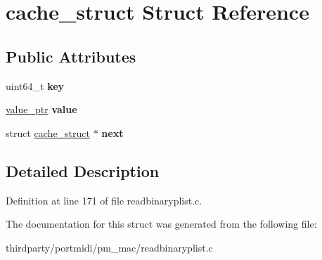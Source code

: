 \hypertarget{structcache__struct}{}\section{cache\+\_\+struct Struct Reference}
\label{structcache__struct}
\subsection*{Public Attributes}
\begin{DoxyCompactItemize}
\item 
\mbox{\label{structcache__struct_af242c8abd9d0d23e8fb7b8c0809fa598}} 
uint64\+\_\+t {\bfseries key}
\item 
\mbox{\label{structcache__struct_aafd2fa83cd12c368a8c1ecfe71c7eb2c}} 
\hyperlink{structvalue__struct}{value\+\_\+ptr} {\bfseries value}
\item 
\mbox{\label{structcache__struct_a83ba7f55c16385762f41cb542f461dda}} 
struct \hyperlink{structcache__struct}{cache\+\_\+struct} $\ast$ {\bfseries next}
\end{DoxyCompactItemize}


\subsection{Detailed Description}


Definition at line 171 of file readbinaryplist.\+c.



The documentation for this struct was generated from the following file\+:\begin{DoxyCompactItemize}
\item 
thirdparty/portmidi/pm\+\_\+mac/readbinaryplist.\+c\end{DoxyCompactItemize}
